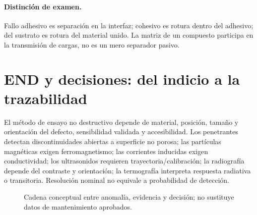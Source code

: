\paragraph{Distinción de examen.} Fallo adhesivo es separación en la interfaz; cohesivo es rotura dentro del adhesivo; del sustrato es rotura del material unido. La matriz de un compuesto participa en la transmisión de cargas, no es un mero separador pasivo.

\section{END y decisiones: del indicio a la trazabilidad}
El método de ensayo no destructivo depende de material, posición, tamaño y orientación del defecto, sensibilidad validada y accesibilidad. Los penetrantes detectan discontinuidades abiertas a superficie no porosa; las partículas magnéticas exigen ferromagnetismo; las corrientes inducidas exigen conductividad; los ultrasonidos requieren trayectoria/calibración; la radiografía depende del contraste y orientación; la termografía interpreta respuesta radiativa o transitoria. Resolución nominal no equivale a probabilidad de detección.

\begin{figure}[htbp]\centering
{}
\caption{Cadena conceptual entre anomalía, evidencia y decisión; no sustituye datos de mantenimiento aprobados.}
\label{fig:av-matmo-evidencia}
\end{figure}

